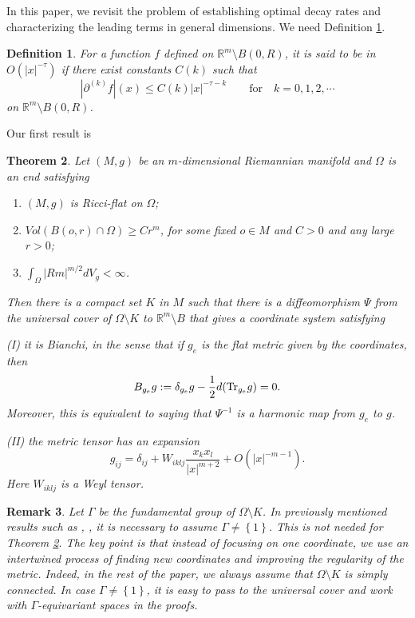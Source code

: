 \documentclass{amsart}
\newtheorem{thm}{Theorem}[section]
\newtheorem{defn}[thm]{Definition}
\newtheorem{rem}[thm]{Remark}
\newcommand{\abs}[1]{\left\vert#1\right\vert}
\newcommand{\set}[1]{\left\{#1\right\}}
\newcommand{\Real}{\mathbb R}
\numberwithin{equation}{section}
\begin{document}
In this paper, we revisit the problem of establishing optimal decay rates and characterizing the leading terms in general dimensions. We need Definition \ref{defn:O}.
\begin{defn}
	\label{defn:O}
	For a function $f$ defined on $\Real^m\setminus  B(0,R)$, it is said to be in $O(\abs{x}^{-\tau})$ if there exist constants $C(k)$ such that
	\[
		\abs{\partial^{(k)} f}(x)\leq C(k) \abs{x}^{-\tau-k} \qquad \text{for} \quad k=0,1,2,\cdots 
	\]
	on $\Real^m \setminus B(0,R)$.
\end{defn}
Our first result is
\begin{thm}
	\label{thm:main1}
	Let $(M,g)$ be an $m$-dimensional Riemannian manifold and $\Omega$ is an end satisfying
	\begin{enumerate}
		\item $(M,g)$ is Ricci-flat on $\Omega$;
		\item $Vol(B(o,r)\cap \Omega)\geq C r^m$, for some fixed $o\in M$ and $C>0$ and any large $r>0$;
		\item $\int_\Omega \abs{Rm}^{m/2} dV_g<\infty $.
	\end{enumerate}
	Then there is a compact set $K$ in $M$ such that there is a diffeomorphism $\Psi$ from the universal cover of $\Omega \setminus K$ to $\Real^m \setminus B$ that gives a coordinate system satisfying

	(I) it is Bianchi, in the sense that if $g_e$ is the flat metric given by the coordinates, then
	\[
		B_{g_e}g := \delta_{g_e}g - \frac{1}{2} d({\rm Tr}_{g_e} g)=0.
	\]
	Moreover, this is equivalent to saying that $\Psi^{-1}$ is a harmonic map from $g_e$ to $g$.

	(II) the metric tensor has an expansion
	\begin{equation}
		\label{eqn:expansion}
		g_{ij}= \delta_{ij} + W_{iklj}\frac{x_k x_l}{\abs{x}^{{m}+2}} + O(\abs{x}^{-m-1}).
	\end{equation}
	Here $W_{iklj}$ is a Weyl tensor.
\end{thm}

\begin{rem}
	Let $\Gamma$ be the fundamental group of $\Omega\setminus K$. In previously mentioned results such as \cite{cheeger1994}, \cite{kroencke2022optimal}, it is necessary to assume $\Gamma\ne \set{1}$. This is not needed for Theorem \ref{thm:main1}. The key point is that instead of focusing on one coordinate, we use an intertwined process of finding new coordinates and improving the regularity of the metric. Indeed, in the rest of the paper, we always assume that $\Omega\setminus K$ is simply connected. In case $\Gamma\ne \set{1}$, it is easy to pass to the universal cover and work with $\Gamma$-equivariant spaces in the proofs.
\end{rem}
\end{document}
